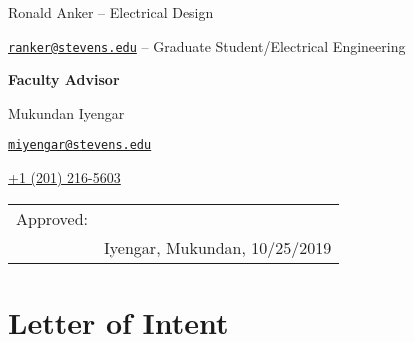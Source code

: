 \documentclass{article}
\let\Oldsection\section
\renewcommand{\section}{\FloatBarrier\Oldsection}
\begin{document}
\begin{center}
{Ronald Anker -- Electrical Design

\href{mailto:ranker@stevens.edu}{\nolinkurl{ranker@stevens.edu}} -- Graduate Student/Electrical Engineering

\bigskip
\bigskip

\textbf{Faculty Advisor}

Mukundan Iyengar

\href{mailto:miyengar@stevens.edu}{\nolinkurl{miyengar@stevens.edu}}

\href{tel:12012165603}{+1 (201) 216-5603}

\bigskip
\bigskip
\bigskip
\bigskip
\bigskip
\bigskip
\bigskip
\bigskip
\bigskip
\bigskip
\bigskip

\begin{tabular}{@{}p{.5in}p{3.5in}@{}}
Approved: & \hrulefill \\
& Iyengar, Mukundan, 10/25/2019\\
\end{tabular}
}

\end{center}

\newpage

{
\tableofcontents
}

\newpage

\section{Letter of Intent}
\end{document}
